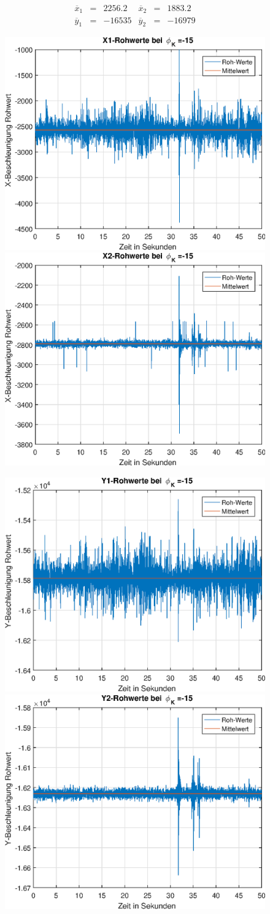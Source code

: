 \documentclass{article}
\begin{document}
\begin{equation}
\begin{array}{lclclcl}
\overline{x}_1 &=& 2256.2 & \overline{x}_2 &=& 1883.2 \\
\overline{y}_1 &=& -16535 & \overline{y}_2 &=& -16979
\end{array}
\end{equation}
\newpage
\begin{figure}[h]
	\includegraphics[width=0.5\linewidth]{img/phiK-15_x1_raw.eps}
	\includegraphics[width=0.5\linewidth]{img/phiK-15_x2_raw.eps}
\end{figure}
\begin{figure}[h]
	\includegraphics[width=0.5\linewidth]{img/phiK-15_y1_raw.eps}
	\includegraphics[width=0.5\linewidth]{img/phiK-15_y2_raw.eps}
\end{figure}
\end{document}
